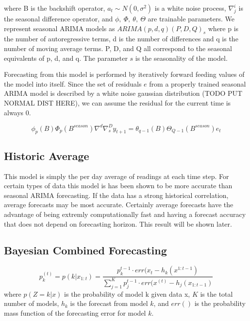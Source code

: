 \documentclass{acm_proc_article-sp}
\begin{document}
\noindent
where B is the backshift operator, $a_{t} \sim N(0, \sigma^{2})$ is a white noise process, $\nabla^{i}_{j}$ is the seasonal difference operator, and $\phi,\  \Phi,\  \theta,\ \Theta$ are trainable parameters.  We represent seasonal ARIMA models as $ARIMA(p,d,q)(P,D,Q)_{s}$ where p is the number of autoregressive terms, d is the number of differences and q is the number of moving average terms.  P, D, and Q all correspond to the seasonal equivalents of p, d, and q.  The parameter $s$ is the seasonality of the model.\newline

Forecasting from this model is performed by iteratively forward feeding values of the model into itself.  Since the set of residuals $e$ from a properly trained seasonal ARIMA model is described by a white noise gaussian distribution (TODO PUT NORMAL DIST HERE), we can assume the residual for the current time is always 0. 

\begin{equation}
\label{eq:sarima}
\phi_{p}(B)\Phi_{p}(B^{season})\nabla^{d}\nabla^{D}_{s}y_{t + 1} = \theta_{q - 1}(B)\Theta_{Q - 1}(B^{season})e_{t}
\end{equation}

\subsection{Historic Average}
This model is simply the per day average of readings at each time step.  For certain types of data this model is has been shown to be more accurate than seasonal ARIMA forecasting.  If the data has a strong historical correlation, average forecasts may be most accurate.  Certainly average forecasts have the advantage of being extremly computationally fast and having a forecast accuracy that does not depend on forecasting horizon.  This result will be shown later.

\subsection{Bayesian Combined Forecasting}

\begin{equation}
\label{eq:model_prob}
p_{k}^{(t)} = p(k|x_{1:t}) = \frac{p_{k}^{t - 1} \cdot err(x_{t} - h_{k}(x^{1:t-1})}{\sum_{j=1}^{K}p_{j}^{t - 1} \cdot err(x^{(t)} - h_{j}(x_{1:t-1})}
\end{equation}
\noindent
where $p(Z=k|x)$ is the probability of model k given data x, $K$ is the total number of models, $h_{k}$ is the forecast from model $k$, and $err()$ is the probability mass function of the forecasting error for model $k$.  
\end{document}
